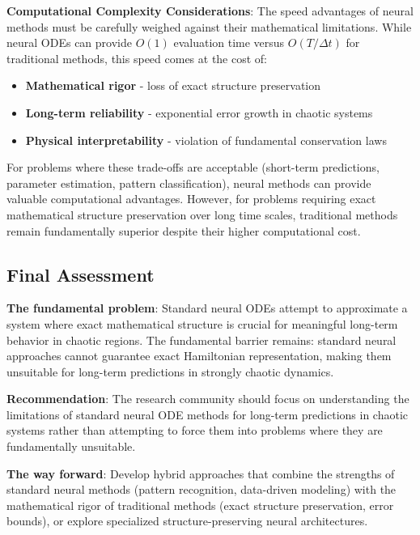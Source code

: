\documentclass[11pt,a4paper]{article}
\begin{document}
\textbf{Computational Complexity Considerations}: The speed advantages of neural methods must be carefully weighed against their mathematical limitations. While neural ODEs can provide $O(1)$ evaluation time versus $O(T/\Delta t)$ for traditional methods, this speed comes at the cost of:
\begin{itemize}
    \item \textbf{Mathematical rigor} - loss of exact structure preservation
    \item \textbf{Long-term reliability} - exponential error growth in chaotic systems
    \item \textbf{Physical interpretability} - violation of fundamental conservation laws
\end{itemize}

For problems where these trade-offs are acceptable (short-term predictions, parameter estimation, pattern classification), neural methods can provide valuable computational advantages. However, for problems requiring exact mathematical structure preservation over long time scales, traditional methods remain fundamentally superior despite their higher computational cost.





\subsection{Final Assessment}

\textbf{The fundamental problem}: Standard neural ODEs attempt to approximate a system where exact mathematical structure is crucial for meaningful long-term behavior in chaotic regions. The fundamental barrier remains: standard neural approaches cannot guarantee exact Hamiltonian representation, making them unsuitable for long-term predictions in strongly chaotic dynamics.

\textbf{Recommendation}: The research community should focus on understanding the limitations of standard neural ODE methods for long-term predictions in chaotic systems rather than attempting to force them into problems where they are fundamentally unsuitable.

\textbf{The way forward}: Develop hybrid approaches that combine the strengths of standard neural methods (pattern recognition, data-driven modeling) with the mathematical rigor of traditional methods (exact structure preservation, error bounds), or explore specialized structure-preserving neural architectures.
\end{document}
